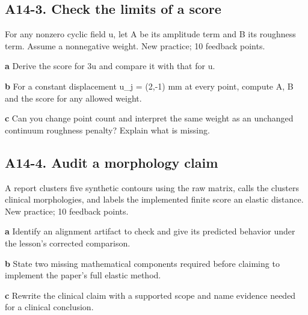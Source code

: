 \documentclass[11pt,letterpaper]{article}
\theoremstyle{definition}\newtheorem{definition}{Definition}\newtheorem{example}{Example}
\numberwithin{equation}{section}
\begin{document}
\par\noindent\begin{minipage}{\linewidth}
\subsection*{A14-3. Check the limits of a score}
For any nonzero cyclic field u, let A be its amplitude term and B its roughness term. Assume a nonnegative weight. New practice; 10 feedback points.

\textbf{a} Derive the score for 3u and compare it with that for u.

\end{minipage}\par\medskip
\textbf{b} For a constant displacement u\_j =\allowbreak{} (2,-1) mm at every point, compute A, B and the score for any allowed weight.

\textbf{c} Can you change point count and interpret the same weight as an unchanged continuum roughness penalty? Explain what is missing.

\par\noindent\begin{minipage}{\linewidth}
\subsection*{A14-4. Audit a morphology claim}
A report clusters five synthetic contours using the raw matrix, calls the clusters clinical morphologies, and labels the implemented finite score an elastic distance. New practice; 10 feedback points.

\textbf{a} Identify an alignment artifact to check and give its predicted behavior under the lesson's corrected comparison.

\end{minipage}\par\medskip
\textbf{b} State two missing mathematical components required before claiming to implement the paper's full elastic method.

\textbf{c} Rewrite the clinical claim with a supported scope and name evidence needed for a clinical conclusion.
\end{document}
